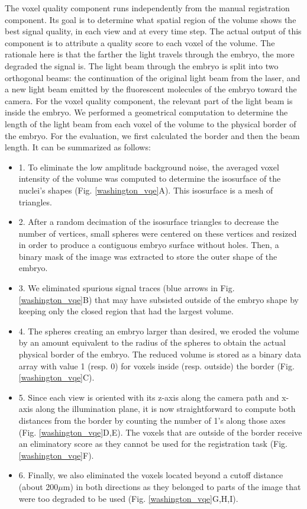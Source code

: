    The voxel quality component runs independently from the manual registration component. Its goal is to determine what spatial region of the volume shows the best signal quality, in each view and at every time step. The actual output of this component is to attribute a quality score to each voxel of the volume. The rationale here is that the farther the light travels through the embryo, the more degraded the signal is. The light beam through the embryo is split into two orthogonal beams: the continuation of the original light beam from the laser, and a new light beam emitted by the fluorescent molecules of the embryo toward the camera. For the voxel quality component, the relevant part of the light beam is inside the embryo. We performed a geometrical computation to determine the length of the light beam from each voxel of the volume to the physical border of the embryo. For the evaluation, we first calculated the border and then the beam length. It can be summarized as follows:  
\begin{itemize}
	\item 1. To eliminate the low amplitude background noise, the averaged voxel intensity of the volume was computed to determine the isosurface of the nuclei's shapes (Fig. \ref{washington_vqe}A). This isosurface is a mesh of triangles. 
	\item 2. After a random decimation of the isosurface triangles to decrease the number of vertices, small spheres were centered on these vertices and resized in order to produce a contiguous embryo surface without holes. Then, a binary mask of the image was extracted to store the outer shape of the embryo.
	\item 3. We eliminated spurious signal traces (blue arrows in Fig. \ref{washington_vqe}B) that may have subsisted outside of the embryo shape by keeping only the closed region that had the largest volume.
	\item 4. The spheres creating an embryo larger than desired, we eroded the volume by an amount equivalent to the radius of the spheres to obtain the actual physical border of the embryo. The reduced volume is stored as a binary data array with value 1 (resp. 0) for voxels inside (resp. outside) the border (Fig. \ref{washington_vqe}C).
	\item 5. Since each view is oriented with its z-axis along the camera path and x-axis along the illumination plane, it is now straightforward to compute both distances from the border by counting the number of 1's along those axes (Fig. \ref{washington_vqe}D,E). The voxels that are outside of the border receive an eliminatory score as they cannot be used for the registration task (Fig. \ref{washington_vqe}F).
	\item 6. Finally, we also eliminated the voxels located beyond a cutoff distance (about 200$\mu$m) in both directions as they belonged to parts of the image that were too degraded to be used (Fig. \ref{washington_vqe}G,H,I).
\end{itemize}
